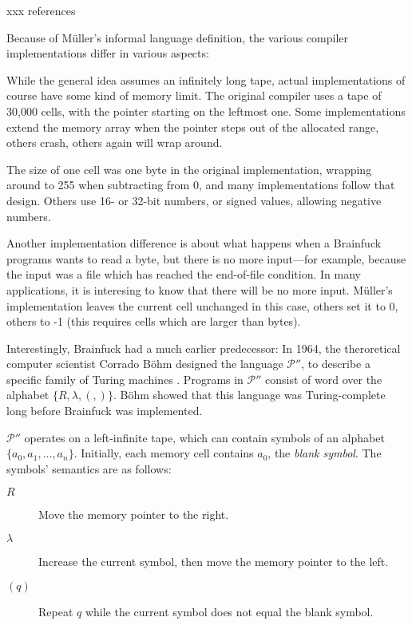 xxx references

Because of Müller's informal language definition, the various compiler implementations differ in various aspects:

While the general idea assumes an infinitely long tape, actual implementations of course have some kind of memory limit. The original compiler uses a tape of 30,000 cells, with the pointer starting on the leftmost one. Some implementations extend the memory array when the pointer steps out of the allocated range, others crash, others again will wrap around.

The size of one cell was one byte in the original implementation, wrapping around to 255 when subtracting from 0, and many implementations follow that design. Others use 16- or 32-bit numbers, or signed values, allowing negative numbers.

Another implementation difference is about what happens when a Brainfuck programs wants to read a byte, but there is no more input---for example, because the input was a file which has reached the end-of-file condition. In many applications, it is interesing to know that there will be no more input. Müller's implementation leaves the current cell unchanged in this case, others set it to 0, others to -1 (this requires cells which are larger than bytes).

Interestingly, Brainfuck had a much earlier predecessor: In 1964, the theroretical computer scientist Corrado Böhm designed the language $\mathcal{P}''$, to describe a specific family of Turing machines \cite{bohm1964family}. Programs in $\mathcal{P}''$ consist of word over the alphabet $\{R, \lambda, (, )\}$. Böhm showed that this language was Turing-complete long before Brainfuck was implemented.

$\mathcal{P}''$ operates on a left-infinite tape, which can contain symbols of an alphabet $\{a_0, a_1, \dots, a_n\}$. Initially, each memory cell contains $a_0$, the \emph{blank symbol}. The symbols' semantics are as follows:

\begin{description}
    \item[\boldmath$R$] Move the memory pointer to the right.
    \item[\boldmath$\lambda$] Increase the current symbol, then move the memory pointer to the left.
    \item[\boldmath$(q)$] Repeat $q$ while the current symbol does not equal the blank symbol.
\end{description}

